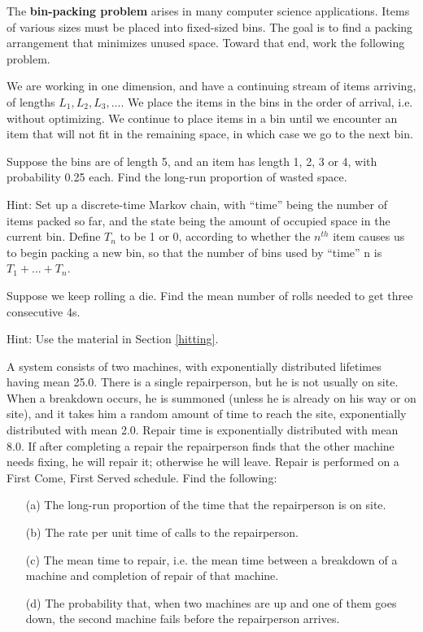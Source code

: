 \oneproblem
The {\bf bin-packing problem} arises in many computer science
applications.  Items of various sizes must be placed into fixed-sized
bins.  The goal is to find a packing arrangement that minimizes unused
space.  Toward that end, work the following problem.

We are working in one dimension, and have a continuing stream of items
arriving, of lengths $L_1, L_2, L_3,...$.  We place the items in the
bins in the order of arrival, i.e. without optimizing.  We continue to
place items in a bin until we encounter an item that will not fit in the
remaining space, in which case we go to the next bin.

Suppose the bins are of length 5, and an item has length 1, 2, 3 or 4,
with probability 0.25 each.  Find the long-run proportion of wasted
space.

Hint:  Set up a discrete-time Markov chain, with ``time'' being the
number of items packed so far, and the state being the amount of
occupied space in the current bin.  Define $T_n$ to be 1 or 0, according
to whether the $n^{th}$ item causes us to begin packing a new bin, so
that the number of bins used by ``time'' n is $T_1+...+T_n$.

\oneproblem
Suppose we keep rolling a die.  Find the mean number of rolls needed to
get three consecutive 4s.

Hint:  Use the material in Section \ref{hitting}.

\oneproblem
A system consists of two machines, with exponentially distributed
lifetimes having mean 25.0. There is a single repairperson, but he is
not usually on site.  When a breakdown occurs, he is summoned (unless he
is already on his way or on site), and it takes him a random amount of
time to reach the site, exponentially distributed with mean 2.0. Repair
time is exponentially distributed with mean 8.0. If after completing a
repair the repairperson finds that the other machine needs fixing, he
will  repair it; otherwise he will leave. Repair is performed on a First
Come, First Served schedule.  Find the following:

\begin{itemize}

\item [(a)] The long-run proportion of the time that the repairperson is
on site.

\item [(b)] The rate per unit time of calls to the repairperson.

\item [(c)] The mean time to repair, i.e. the mean time between a
breakdown of a machine and completion of repair of that machine.

\item [(d)] The probability that, when two machines are up and one of
them goes down, the second machine fails before the repairperson
arrives.

\end{itemize}

